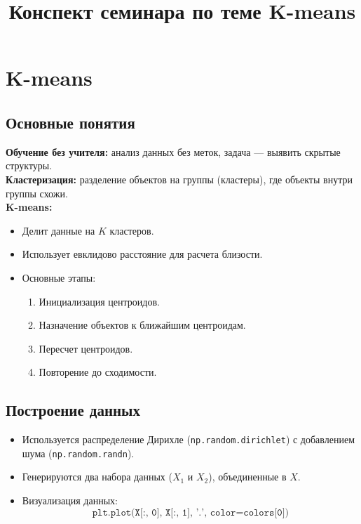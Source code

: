 \documentclass[a4paper,12pt]{article}
\author{}
\date{}
\begin{document}
\maketitle

\section*{K-means}
\title{Конспект семинара по теме K-means}


\subsection*{Основные понятия}
\textbf{Обучение без учителя:} анализ данных без меток, задача — выявить скрытые структуры.\\
\textbf{Кластеризация:} разделение объектов на группы (кластеры), где объекты внутри группы схожи.\\
\textbf{K-means:}
\begin{itemize}
    \item Делит данные на $K$ кластеров.
    \item Использует евклидово расстояние для расчета близости.
    \item Основные этапы:
    \begin{enumerate}
        \item Инициализация центроидов.
        \item Назначение объектов к ближайшим центроидам.
        \item Пересчет центроидов.
        \item Повторение до сходимости.
    \end{enumerate}
\end{itemize}

\subsection*{Построение данных}
\begin{itemize}
    \item Используется распределение Дирихле (\texttt{np.random.dirichlet}) с добавлением шума (\texttt{np.random.randn}).
    \item Генерируются два набора данных ($X_1$ и $X_2$), объединенные в $X$.
    \item Визуализация данных:
    \[
    \texttt{plt.plot(X[:, 0], X[:, 1], '.', color=colors[0])}
    \]
\end{itemize}
\end{document}

